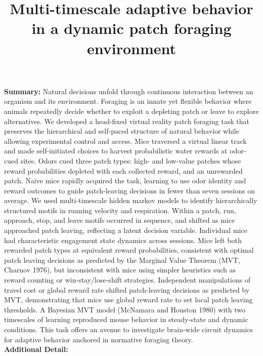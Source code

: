 \documentclass[12pt]{article}
\author{}
\date{}
\title{\large\textbf{Multi-timescale adaptive behavior in a dynamic patch foraging environment}}
\begin{document}
\maketitle
\noindent\textbf{Summary: }Natural decisions unfold through continuous interaction between an organism and its environment. Foraging is an innate yet flexible behavior where animals repeatedly decide whether to exploit a depleting patch or leave to explore alternatives. We developed a head-fixed virtual reality patch foraging task that preserves the hierarchical and self-paced structure of natural behavior while allowing experimental control and access. Mice traversed a virtual linear track and made self-initiated choices to harvest probabilistic water rewards at odor-cued sites. Odors cued three patch types: high- and low-value patches whose reward probabilities depleted with each collected reward, and an unrewarded patch. Naïve mice rapidly acquired the task, learning to use odor identity and reward outcomes to guide patch-leaving decisions in fewer than seven sessions on average. We used multi-timescale hidden markov models to identify hierarchically structured motifs in running velocity and respiration. Within a patch, run, approach, stop, and leave motifs occurred in sequence, and shifted as mice approached patch leaving, reflecting a latent decision variable. Individual mice had characteristic engagement state dynamics across sessions. Mice left both rewarded patch types at equivalent reward probabilities, consistent with optimal patch leaving decisions as predicted by the Marginal Value Theorem (MVT, Charnov 1976), but inconsistent with mice using simpler heuristics such as reward counting or win-stay/lose-shift strategies. Independent manipulations of travel cost or global reward rate shifted patch-leaving decisions as predicted by MVT, demonstrating that mice use global reward rate to set local patch leaving thresholds. A Bayesian MVT model (McNamara and Houston 1980) with two timescales of learning reproduced mouse behavior in steady-state and dynamic conditions. This task offers an avenue to investigate brain-wide circuit dynamics for adaptive behavior anchored in normative foraging theory.  \\
\textbf{Additional Detail:}


\newcommand{\FigTwoVersion}{fig2}

\end{document}
